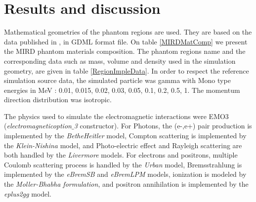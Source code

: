 \documentclass[letterpaper,12pt]{article}
\begin{document}
\section{ Results and discussion } 

Mathematical geometries of the phantom regions are used. They are based on the data published in \cite{MIRDRefSAFData}, \cite{G4HumanPhantom} in GDML format file. On table \ref{MIRDMatComp} we present the MIRD phantom materials composition. The phantom regions name and the corresponding data such as mass, volume and density used in the simulation geometry, are given in table \ref{RegionImpleData}. In order to respect the reference simulation source data, the simulated particle was gamma with Mono type energies in MeV : 0.01, 0.015, 0.02, 0.03, 0.05, 0.1, 0.2, 0.5, 1. The momentum direction distribution was isotropic. 

The physics used to simulate the electromagnetic interactions were EMO3 (\textit{electromagneticoption$\_$3} constructor). For Photons, the (e-,e+) pair production is implemented by the \textit{BetheHeitler} model, Compton scattering is implemented by the \textit{Klein-Nishina} model, and Photo-electric effect and Rayleigh  scattering are both handled by the \textit{Livermore} models. For electrons and positrons, multiple Coulomb scattering process is handled by the \textit{Urban} model, Bremsstrahlung is implemented by the \textit{eBremSB} and \textit{eBremLPM} models, ionization is modeled by the \textit{Moller-Bhabha formulation}, and positron annihilation is implemented by the \textit{eplus2gg} model.
\end{document}
